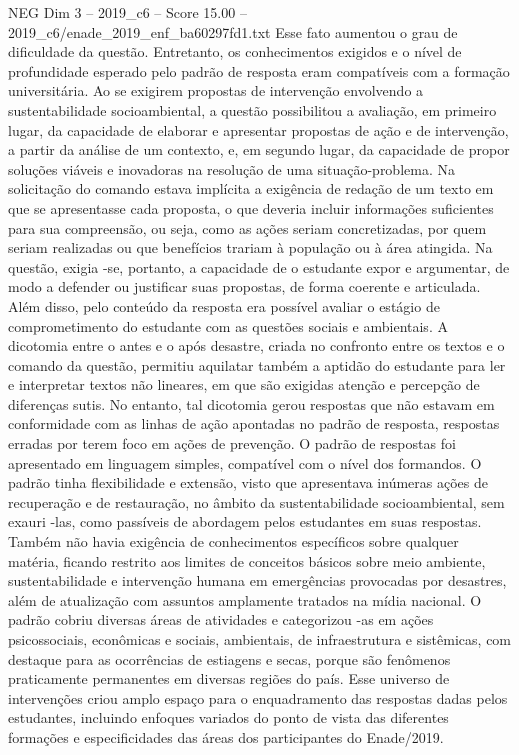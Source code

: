 \begin{textsample}{NEG Dim 3 – 2019\_c6 – Score 15.00 – 2019\_c6/enade\_2019\_enf\_ba60297fd1.txt}
Esse fato aumentou o grau de dificuldade da questão.
Entretanto, os conhecimentos exigidos e o nível de profundidade esperado pelo padrão de resposta eram compatíveis com a formação universitária.
Ao se exigirem propostas de intervenção envolvendo a sustentabilidade socioambiental, a questão possibilitou a avaliação, em primeiro lugar, da capacidade de elaborar e apresentar propostas de ação e de intervenção, a partir da análise de um contexto, e, em segundo lugar, da capacidade de propor soluções viáveis e inovadoras na resolução de uma situação-problema.
Na solicitação do comando estava implícita a exigência de redação de um texto em que se apresentasse cada proposta, o que deveria incluir informações suficientes para sua compreensão, ou seja, como as ações seriam concretizadas, por quem seriam realizadas ou que benefícios trariam à população ou à área atingida.
Na questão, exigia -se, portanto, a capacidade de o estudante expor e argumentar, de modo a defender ou justificar suas propostas, de forma coerente e articulada.
Além disso, pelo conteúdo da resposta era possível avaliar o estágio de comprometimento do estudante com as questões sociais e ambientais.
A dicotomia entre o antes e o após desastre, criada no confronto entre os textos e o comando da questão, permitiu aquilatar também a aptidão do estudante para ler e interpretar textos não lineares, em que são exigidas atenção e percepção de diferenças sutis.
No entanto, tal dicotomia gerou respostas que não estavam em conformidade com as linhas de ação apontadas no padrão de resposta, respostas erradas por terem foco em ações de prevenção.
O padrão de respostas foi apresentado em linguagem simples, compatível com o nível dos formandos.
O padrão tinha flexibilidade e extensão, visto que apresentava inúmeras ações de recuperação e de restauração, no âmbito da sustentabilidade socioambiental, sem exauri -las, como passíveis de abordagem pelos estudantes em suas respostas.
Também não havia exigência de conhecimentos específicos sobre qualquer matéria, ficando restrito aos limites de conceitos básicos sobre meio ambiente, sustentabilidade e intervenção humana em emergências provocadas por desastres, além de atualização com assuntos amplamente tratados na mídia nacional.
O padrão cobriu diversas áreas de atividades e categorizou -as em ações psicossociais, econômicas e sociais, ambientais, de infraestrutura e sistêmicas, com destaque para as ocorrências de estiagens e secas, porque são fenômenos praticamente permanentes em diversas regiões do país.
Esse universo de intervenções criou amplo espaço para o enquadramento das respostas dadas pelos estudantes, incluindo enfoques variados do ponto de vista das diferentes formações e especificidades das áreas dos participantes do Enade/2019.

\end{textsample}
